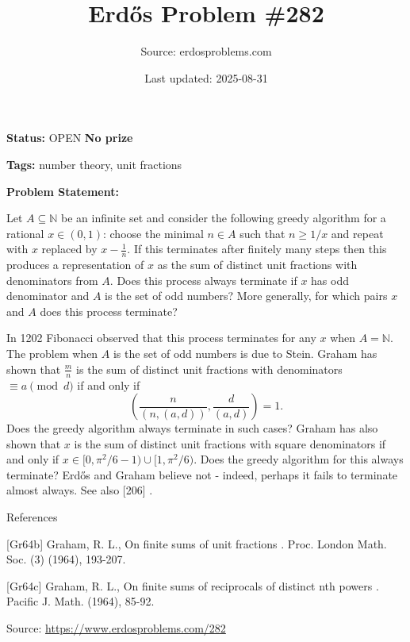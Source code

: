 \documentclass{article}
\title{Erd\H{o}s Problem \#282}
\date{Last updated: 2025-08-31}
\author{Source: erdosproblems.com}
\begin{document}
\maketitle

\noindent\textbf{Status:} OPEN \quad \textbf{No prize}

\noindent\textbf{Tags:} number theory, unit fractions

\medskip

\noindent\textbf{Problem Statement:}

Let $A\subseteq \mathbb{N}$ be an infinite set and consider the following greedy algorithm for a rational $x\in (0,1)$: choose the minimal $n\in A$ such that $n\geq 1/x$ and repeat with $x$ replaced by $x-\frac{1}{n}$. If this terminates after finitely many steps then this produces a representation of $x$ as the sum of distinct unit fractions with denominators from $A$. Does this process always terminate if $x$ has odd denominator and $A$ is the set of odd numbers? More generally, for which pairs $x$ and $A$ does this process terminate?




In 1202 Fibonacci observed that this process terminates for any $x$ when $A=\mathbb{N}$. The problem when $A$ is the set of odd numbers is due to Stein. Graham \cite{Gr64b} has shown that $\frac{m}{n}$ is the sum of distinct unit fractions with denominators $\equiv a\pmod{d}$ if and only if\[\left(\frac{n}{(n,(a,d))},\frac{d}{(a,d)}\right)=1.\]Does the greedy algorithm always terminate in such cases? Graham \cite{Gr64c} has also shown that $x$ is the sum of distinct unit fractions with square denominators if and only if $x\in [0,\pi^2/6-1)\cup [1,\pi^2/6)$. Does the greedy algorithm for this always terminate? Erd\H{o}s and Graham believe not - indeed, perhaps it fails to terminate almost always. See also [206] .




References

[Gr64b] Graham, R. L., On finite sums of unit fractions . Proc. London Math. Soc. (3) (1964), 193-207.

[Gr64c] Graham, R. L., On finite sums of reciprocals of distinct nth powers . Pacific J. Math. (1964), 85-92.


\bigskip
\noindent\small{Source: \url{https://www.erdosproblems.com/282}}
\end{document}
